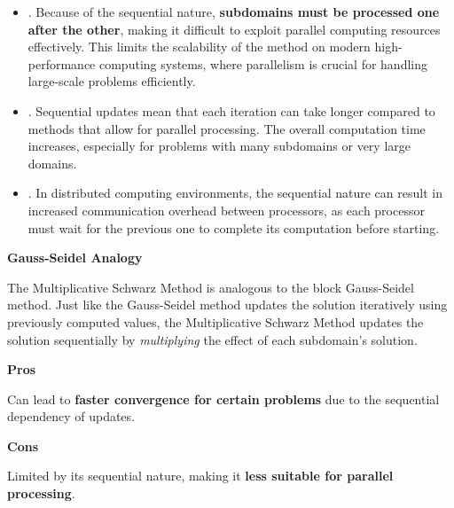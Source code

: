 \begin{itemize}
    \item {}. Because of the sequential nature, \textbf{subdomains must be processed one after the other}, making it difficult to exploit parallel computing resources effectively. This limits the scalability of the method on modern high-performance computing systems, where parallelism is crucial for handling large-scale problems efficiently.

    \item {}. Sequential updates mean that each iteration can take longer compared to methods that allow for parallel processing. The overall computation time increases, especially for problems with many subdomains or very large domains.

    \item {}. In distributed computing environments, the sequential nature can result in increased communication overhead between processors, as each processor must wait for the previous one to complete its computation before starting.
\end{itemize}

\highspace
\begin{flushleft}
    \textcolor{Green3}{ \textbf{Gauss-Seidel Analogy}}
\end{flushleft}
The Multiplicative Schwarz Method is analogous to the block Gauss-Seidel method. Just like the Gauss-Seidel method updates the solution iteratively using previously computed values, the Multiplicative Schwarz Method updates the solution sequentially by \emph{multiplying} the effect of each subdomain's solution.

\highspace
\begin{flushleft}
    \textcolor{Green3}{ \textbf{Pros}}
\end{flushleft}
Can lead to \textbf{faster convergence for certain problems} due to the sequential dependency of updates.

\highspace
\begin{flushleft}
    \textcolor{Red2}{ \textbf{Cons}}
\end{flushleft}
Limited by its sequential nature, making it \textbf{less suitable for parallel processing}.